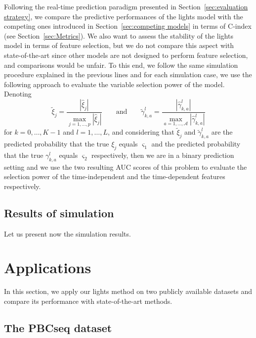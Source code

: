 \documentclass[11pt]{article}
\newcommand{\cA}{\mathcal A}
\begin{document}
Following the real-time prediction paradigm presented in Section~\ref{sec:evaluation strategy}, we compare the predictive performances of the lights model with the competing ones introduced in Section~\ref{sec:competing models} in terms of C-index (see Section~\ref{sec:Metrics}).
We also want to assess the stability of the lights model in terms of feature selection, but we do not compare this aspect with state-of-the-art since other models are not designed to perform feature selection, and comparisons would be unfair. 
To this end, we follow the same simulation procedure explained in the previous lines and for each simulation case, we use the following approach to evaluate the variable selection power of the model. Denoting 
\[\tilde{\xi}_j = \dfrac{|\hat{\xi}_j|}{\max_{j=1,\ldots,p}{|\hat{\xi}_j|}} \qquad \text{and} \qquad \tilde{\gamma}_{k,a}^l = \dfrac{|\hat{\gamma}_{k,a}^l|}{\max_{a=1, \ldots, \cA}{|\hat{\gamma}_{k,a}^l|}}\] 
for $k=0,\ldots,K-1$ and $l=1, \ldots, L$, and considering that $\tilde{\xi}_j$ and $\tilde{\gamma}_{k,a}^l$ are the predicted probability that the true $\xi_j$ equals $\varsigma_1$ and the predicted probability that the true $\gamma_{k,a}^l$ equals $\varsigma_2$ respectively, then we are in a binary prediction setting and we use the two resulting AUC scores of this problem to evaluate the selection power of the time-independent and the time-dependent features respectively.

\subsection{Results of simulation}
\label{sec:simulation results}
Let us present now the simulation results.


\section{Applications}
\label{sec:application}

In this section, we apply our lights method on two publicly available datasets and compare its performance with state-of-the-art methods.

\subsection{The PBCseq dataset}
\end{document}
